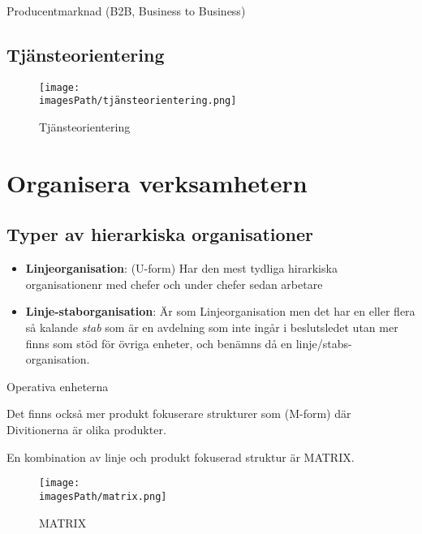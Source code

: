 \documentclass{article}
\newcommand{\imagesPath}{images}
\begin{document}
Producentmarknad (B2B, Business to Business)

\subsection{Tjänsteorientering}
\begin{figure}[!h]
    \centering
    \texttt{[image: \\imagesPath/tjänsteorientering.png]}
    \caption{Tjänsteorientering}
\end{figure}


\section{Organisera verksamhetern}
\subsection{Typer av hierarkiska organisationer}
\begin{itemize}
    \item \textbf{Linjeorganisation}: (U-form) \newline
    Har den mest tydliga hirarkiska organisationenr med chefer och under chefer sedan arbetare
    \item \textbf{Linje-staborganisation}: \newline
    Är som Linjeorganisation men det har en eller flera så kalande \textit{stab} som 
    är en avdelning som inte ingår i beslutsledet utan mer finns som stöd för övriga enheter, och benämns
    då en linje/stabs-organisation.
\end{itemize}
Operativa enheterna

Det finns också mer produkt fokuserare strukturer som (M-form)
där Divitionerna är olika produkter.

En kombination av linje och produkt fokuserad struktur är MATRIX.
\begin{figure}[!h]
    \centering
    \texttt{[image: \\imagesPath/matrix.png]}
    \caption{MATRIX}
\end{figure}
\end{document}
